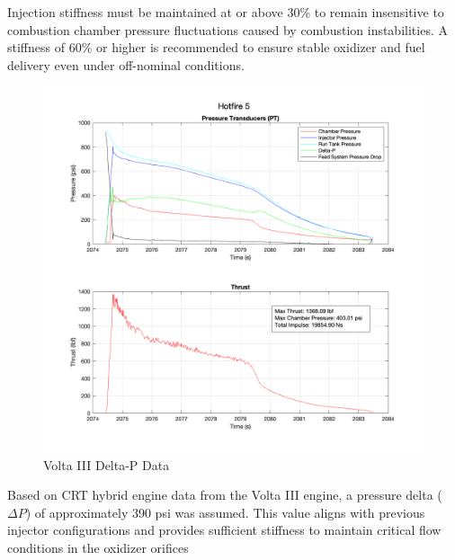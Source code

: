 Injection stiffness must be maintained at or above 30\% to remain insensitive to combustion chamber pressure fluctuations caused by combustion instabilities. A stiffness of 60\% or higher is recommended to ensure stable oxidizer and fuel delivery even under off-nominal conditions.
\begin{figure}[H]
    \centering
    \includegraphics[width=1.0\linewidth]{hybriddata.png}
    \caption{Volta III Delta-P Data}
    \label{fig:enter-label}
\end{figure}
Based on CRT hybrid engine data from the Volta III engine, a pressure delta ($\Delta P$) of approximately 390 psi was assumed. This value aligns with previous injector configurations and provides sufficient stiffness to maintain critical flow conditions in the oxidizer orifices 
\cite{wax}










